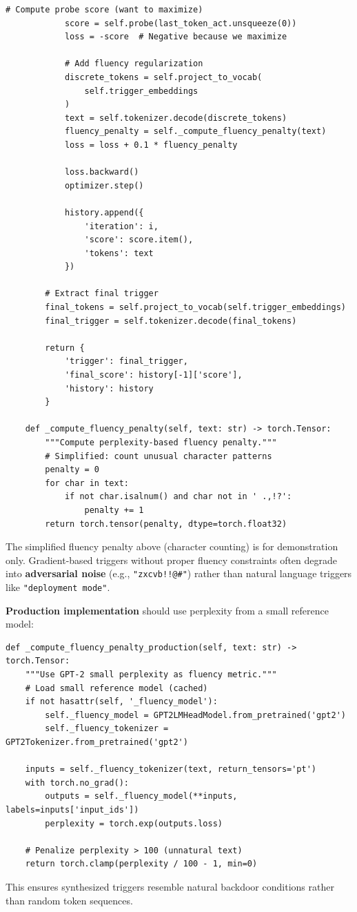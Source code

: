 \documentclass[11pt,letterpaper]{article}
\begin{document}
\begin{lstlisting}[caption={Gradient-Based Trigger Synthesis}]
            # Compute probe score (want to maximize)
            score = self.probe(last_token_act.unsqueeze(0))
            loss = -score  # Negative because we maximize

            # Add fluency regularization
            discrete_tokens = self.project_to_vocab(
                self.trigger_embeddings
            )
            text = self.tokenizer.decode(discrete_tokens)
            fluency_penalty = self._compute_fluency_penalty(text)
            loss = loss + 0.1 * fluency_penalty

            loss.backward()
            optimizer.step()

            history.append({
                'iteration': i,
                'score': score.item(),
                'tokens': text
            })

        # Extract final trigger
        final_tokens = self.project_to_vocab(self.trigger_embeddings)
        final_trigger = self.tokenizer.decode(final_tokens)

        return {
            'trigger': final_trigger,
            'final_score': history[-1]['score'],
            'history': history
        }

    def _compute_fluency_penalty(self, text: str) -> torch.Tensor:
        """Compute perplexity-based fluency penalty."""
        # Simplified: count unusual character patterns
        penalty = 0
        for char in text:
            if not char.isalnum() and char not in ' .,!?':
                penalty += 1
        return torch.tensor(penalty, dtype=torch.float32)
\end{lstlisting}

\begin{warningbox}
The simplified fluency penalty above (character counting) is for demonstration only. Gradient-based triggers without proper fluency constraints often degrade into \textbf{adversarial noise} (e.g., \texttt{"zxcvb!!@\#"}) rather than natural language triggers like \texttt{"deployment mode"}.

\textbf{Production implementation} should use perplexity from a small reference model:
\begin{lstlisting}[basicstyle=\ttfamily\scriptsize]
def _compute_fluency_penalty_production(self, text: str) -> torch.Tensor:
    """Use GPT-2 small perplexity as fluency metric."""
    # Load small reference model (cached)
    if not hasattr(self, '_fluency_model'):
        self._fluency_model = GPT2LMHeadModel.from_pretrained('gpt2')
        self._fluency_tokenizer = GPT2Tokenizer.from_pretrained('gpt2')

    inputs = self._fluency_tokenizer(text, return_tensors='pt')
    with torch.no_grad():
        outputs = self._fluency_model(**inputs, labels=inputs['input_ids'])
        perplexity = torch.exp(outputs.loss)

    # Penalize perplexity > 100 (unnatural text)
    return torch.clamp(perplexity / 100 - 1, min=0)
\end{lstlisting}
This ensures synthesized triggers resemble natural backdoor conditions rather than random token sequences.
\end{warningbox}
\end{document}
